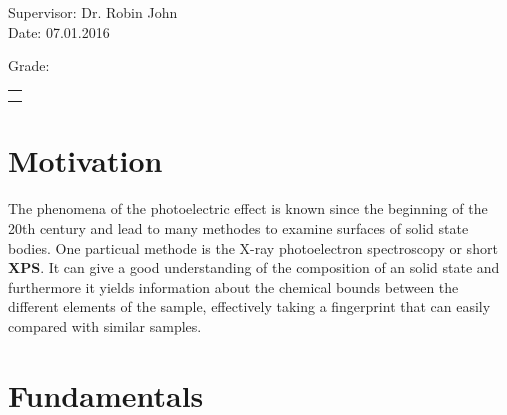 \documentclass[numbers=noenddot,a4paper]{article}
\title{\fett{\underline{Protokoll: X-Ray
			Photoelectron Spectroskopy}}} %
\author{Alexander Jankowski, Philipp Hacker}
\date{\today}
\begin{document}
	\renewcommand*{\equationautorefname}{eq.}
	\renewcommand*{\figureautorefname}{fig.}
	\renewcommand*{\tableautorefname}{tab.}
	\renewcommand*{\sectionautorefname}{sec.}
	\renewcommand*{\subsectionautorefname}{sec.}
	\renewcommand*{\subsubsectionautorefname}{sec.}
	\renewcommand*{\figurename}{Fig. }
	\renewcommand*{\tablename}{Tab.}
	
	\renewcommand*{\figurename}{Figure }
	\renewcommand*{\tablename}{Table}


	\maketitle
\begin{center}
Supervisor: Dr. Robin John\\ %
Date: 07.01.2016 \\ %
		\begin{table}[h]
	\centering
	Grade: %
			\begin{tabularx}{1.5cm}{|X|}
				\hline \\ \\
				\hline
			\end{tabularx}
		\end{table}
	\end{center}


	\vspace*{\fill}
	\tableofcontents
	\vfill
	\clearpage

	\section{Motivation}

The phenomena of the photoelectric effect is known since the beginning of the 20th century and lead to many methodes to examine surfaces of solid state bodies. One particual methode is the X-ray photoelectron spectroscopy or short \textbf{XPS}. It can give a good understanding of the composition of an solid state and furthermore it yields information about the chemical bounds between the different elements of the sample, effectively taking a fingerprint that can easily compared with similar samples. 

	\clearpage
	\section{Fundamentals}
\end{document}
